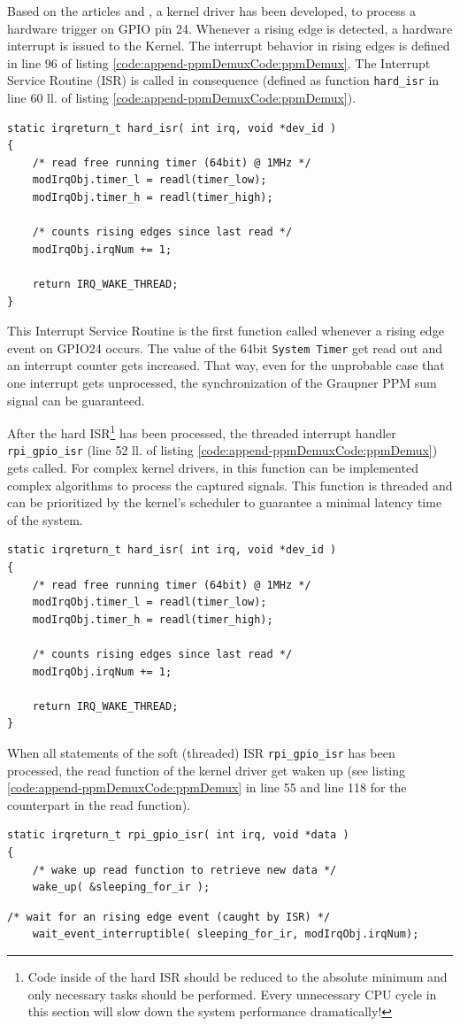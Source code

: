 Based on the articles \cite{doc:Kern70} and \cite{doc:Kern81}, a kernel driver has been developed, to process a hardware trigger on GPIO pin 24. Whenever a rising edge is detected, a hardware interrupt is issued to the Kernel. The interrupt behavior in rising edges is defined in line 96 of listing \ref{code:append-ppmDemuxCode:ppmDemux}. The Interrupt Service Routine (ISR) is called in consequence (defined as function \texttt{hard\_isr} in line 60 ll. of listing \ref{code:append-ppmDemuxCode:ppmDemux}). 
\begin{lstlisting}[firstnumber=60]
static irqreturn_t hard_isr( int irq, void *dev_id )
{
	/* read free running timer (64bit) @ 1MHz */
	modIrqObj.timer_l = readl(timer_low);
	modIrqObj.timer_h = readl(timer_high);

	/* counts rising edges since last read */
	modIrqObj.irqNum += 1;

	return IRQ_WAKE_THREAD;
}
\end{lstlisting}
This Interrupt Service Routine is the first function called whenever a rising edge event on GPIO24 occurs. The value of the 64bit \texttt{System Timer} get read out and an interrupt counter gets increased. That way, even for the unprobable case that one interrupt gets unprocessed, the synchronization of the Graupner PPM sum signal can be guaranteed.

After the hard ISR\footnote{Code inside of the hard ISR should be reduced to the absolute minimum and only necessary tasks should be performed. Every unnecessary CPU cycle in this section will slow down the system performance dramatically!} has been processed, the threaded interrupt handler \texttt{rpi\_gpio\_isr} (line 52 ll. of listing \ref{code:append-ppmDemuxCode:ppmDemux}) gets called. For complex kernel drivers, in this function can be implemented complex algorithms to process the captured signals. This function is threaded and can be prioritized by the kernel's scheduler to guarantee a minimal latency time of the system.
\begin{lstlisting}[firstnumber=60]
static irqreturn_t hard_isr( int irq, void *dev_id )
{
	/* read free running timer (64bit) @ 1MHz */
	modIrqObj.timer_l = readl(timer_low);
	modIrqObj.timer_h = readl(timer_high);

	/* counts rising edges since last read */
	modIrqObj.irqNum += 1;

	return IRQ_WAKE_THREAD;
}
\end{lstlisting}
When all statements of the soft (threaded) ISR \texttt{rpi\_gpio\_isr} has been processed, the read function of the kernel driver get waken up (see listing \ref{code:append-ppmDemuxCode:ppmDemux} in line 55 and line 118 for the counterpart in the read function).
\begin{lstlisting}[firstnumber=52]
static irqreturn_t rpi_gpio_isr( int irq, void *data )
{
	/* wake up read function to retrieve new data */
	wake_up( &sleeping_for_ir );
\end{lstlisting}
\vspace{-0.7cm}
\begin{lstlisting}[firstnumber=117]
	/* wait for an rising edge event (caught by ISR) */
	wait_event_interruptible( sleeping_for_ir, modIrqObj.irqNum);
\end{lstlisting}

